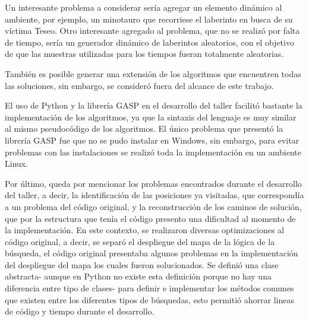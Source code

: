\documentclass[letter, titlepage, 10pt]{article}
\begin{document}
Un interesante problema a considerar sería agregar un elemento dinámico al ambiente, por ejemplo, un minotauro que recorriese el laberinto en busca de su víctima Teseo. Otro interesante agregado al problema, que no se realizó por falta de tiempo, sería un generador dinámico de laberintos aleatorios, con el objetivo de que las muestras utilizadas para los tiempos fueran totalmente aleatorias.

También es posible generar una extensión de los algoritmos que encuentren todas las soluciones, sin embargo, se consideró fuera del alcance de este trabajo. 

El uso de Python y la librería GASP en el desarrollo del taller facilitó bastante la implementación de los algoritmos, ya que la sintaxis del lenguaje es muy similar al mismo pseudocódigo de los algoritmos. El único problema que presentó la librería GASP fue que no se pudo instalar en Windows, sin embargo, para evitar problemas con las instalaciones se realizó toda la implementación en un ambiente Linux.

Por último, queda por mencionar los problemas encontrados durante el desarrollo del taller, a decir, la identificación de las posiciones ya visitadas, que correspondía a un problema del código original, y la reconstrucción de los caminos de solución, que por la estructura que tenía el código presento una dificultad al momento de la implementación. En este contexto, se realizaron diversas optimizaciones al código original, a decir, se separó el despliegue del mapa de la lógica de la búsqueda, el código original presentaba algunos problemas en la implementación del despliegue del mapa los cuales fueron solucionados. Se definió una clase abstracta- aunque en Python no existe esta definición porque no hay una diferencia entre tipo de clases-  para definir e implementar los métodos comunes que existen entre los diferentes tipos de búsquedas, esto permitió ahorrar lineas de código y tiempo durante el desarrollo.



\newpage


\end{document}
